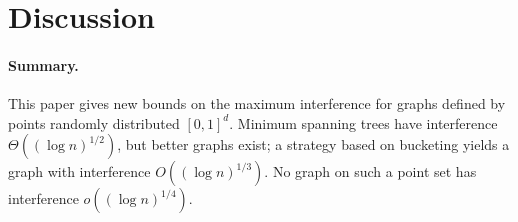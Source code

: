\documentclass{cccg12}
\begin{document}

\section{Discussion}

\paragraph{Summary.}
This paper gives new bounds on the maximum interference for graphs defined
by points randomly distributed $[0,1]^d$. Minimum spanning trees have
interference $\Theta((\log n)^{1/2})$, but better graphs exist; a strategy
based on bucketing yields a graph with interference $O((\log n)^{1/3})$.
No graph on such a point set has interference $o((\log n)^{1/4})$.
\end{document}
